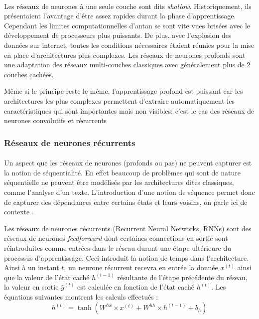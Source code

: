 \paragraph{}
Les réseaux de neurones à une seule couche sont dits \textit{shallow}. Historiquement, ils présentaient l'avantage d'être assez rapides durant la phase d'apprentissage. Cependant les limites computationnelles d'antan se sont vite vues brisées avec le développement de processeurs plus puissants. De plus, avec l'explosion des données sur internet, toutes les conditions nécessaires étaient réunies pour la mise en place d'architectures plus complexes. Les réseaux de neurones profonds sont une adaptation des réseaux multi-couches classiques avec généralement plus de 2 couches cachées. 
\par 
Même si le principe reste le même, l'apprentissage profond est puissant car les architectures les plus complexes permettent d'extraire automatiquement les caractéristiques qui sont importantes mais non visibles; c'est le cas des réseaux de neurones convolutifs et récurrents \citep{dnn} 

\subsubsection{Réseaux de neurones récurrents}\label{seq2seqpart2}
\paragraph{}
Un aspect que les réseaux de neurones (profonds ou pas) ne peuvent capturer est la notion de séquentialité. En effet beaucoup de problèmes qui sont de nature séquentielle ne peuvent être modélisés par les architectures dites classiques, comme l'analyse d'un texte. L'introduction d'une notion de séquence permet donc de capturer des dépendances entre certains états et leurs voisins, on parle ici de contexte \citep{rnn_lstms}.
\par 
Les réseaux de neurones récurrents (Recurrent Neural Networks, RNNs) sont des réseaux de neurones \textit{feedforward} dont certaines connections en sortie sont réintroduites comme entrées dans le réseau durant une étape ultérieure du processus d'apprentissage. Ceci introduit la notion de temps dans l'architecture. Ainsi à un instant $t$, un neurone récurrent recevra en entrée la donnée $x^{(t)}$ ainsi que la valeur de l'état caché $h^{(t-1)}$ résultante de l'étape précédente du réseau, la valeur en sortie $\hat{y}^{(t)}$ est calculée en fonction de l'état caché $h^{(t)}$. Les équations suivantes montrent les calculs effectués \citep{rnn_lstms} :
\begin{equation}
h^{(t)} = \tanh(W^{hx} \times x^{(t)} + W^{hh} \times h^{(t-1)} + b_h)
\end{equation}

